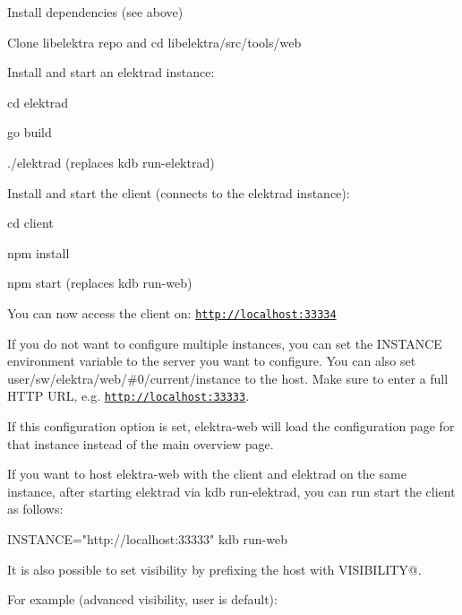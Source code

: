 \begin{DoxyItemize}
\item Install dependencies (see above)
\item Clone libelektra repo and {\ttfamily cd libelektra/src/tools/web}
\item Install and start an elektrad instance\+:
\begin{DoxyItemize}
\item {\ttfamily cd elektrad}
\item {\ttfamily go build}
\item {\ttfamily ./elektrad} (replaces {\ttfamily kdb run-\/elektrad})
\end{DoxyItemize}
\item Install and start the client (connects to the elektrad instance)\+:
\begin{DoxyItemize}
\item {\ttfamily cd client}
\item {\ttfamily npm install}
\item {\ttfamily npm start} (replaces {\ttfamily kdb run-\/web})
\end{DoxyItemize}
\item You can now access the client on\+: \href{http://localhost:33334}{\tt http\+://localhost\+:33334}
\end{DoxyItemize}

If you do not want to configure multiple instances, you can set the {\ttfamily I\+N\+S\+T\+A\+N\+CE} environment variable to the server you want to configure. You can also set {\ttfamily user/sw/elektra/web/\#0/current/instance} to the host. Make sure to enter a full H\+T\+TP U\+RL, e.\+g. {\ttfamily \href{http://localhost:33333}{\tt http\+://localhost\+:33333}}.

If this configuration option is set, elektra-\/web will load the configuration page for that instance instead of the main overview page.

If you want to host elektra-\/web with the client and elektrad on the same instance, after starting elektrad via {\ttfamily kdb run-\/elektrad}, you can run start the client as follows\+:


\begin{DoxyCode}
INSTANCE="http://localhost:33333" kdb run-web
\end{DoxyCode}


It is also possible to set visibility by prefixing the host with {\ttfamily V\+I\+S\+I\+B\+I\+L\+I\+TY@}.

For example ({\ttfamily advanced} visibility, {\ttfamily user} is default)\+:


